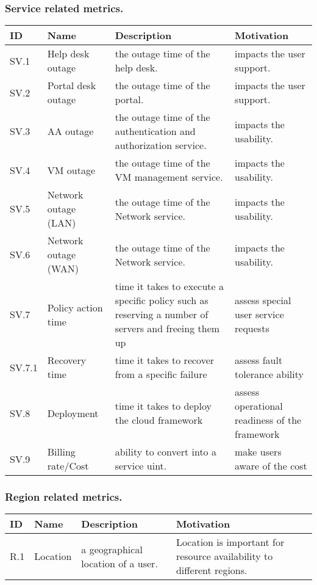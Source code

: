 \documentclass{beamer}
\newcommand{\eTABLE}{\end{tabular}
\end{center}
\end{scriptsize}
}
\newcommand{\bTABLE}[2]{
\frametitle{#1}
\bigskip
\begin{scriptsize}
\begin{center}
\begin{tabular}{lp{0.15\textwidth}p{0.3\textwidth}p{0.4\textwidth}}
\hline
\rowcolor{blue!20} \bf ID & \bf Name & \bf Description & \bf Motivation \\
\hline}
\newenvironment{METRICTABLE}[2] {\bTABLE{#1}{#2}}{\eTABLE}
\begin{document}
\begin{frame}[shrink]
\begin{METRICTABLE}{Service related metrics.}{T:service}
SV.1 &  Help desk outage &  the outage time of the help desk. &  impacts the user support. \\ \hline
SV.2 &  Portal desk outage &  the outage time of the portal. &  impacts the user support. \\ \hline
SV.3 &  AA outage &  the outage time of the authentication and authorization service. &  impacts the usability. \\ \hline
SV.4 &  VM outage &  the outage time of the VM management service. &  impacts the usability. \\ \hline
SV.5 &  Network outage (LAN) &  the outage time of the Network service. &  impacts the usability. \\ \hline
SV.6 &  Network outage (WAN) &  the outage time of the Network service. &  impacts the usability. \\ \hline
SV.7 &  Policy action time & time it takes to execute a specific policy such as reserving a number of servers and freeing them up & assess  special user service requests \\ \hline
SV.7.1 &  Recovery time & time it takes to recover from a specific failure & assess fault tolerance ability \\ \hline
SV.8 &  Deployment & time it takes to deploy the cloud framework  & assess operational readiness of the framework  \\ \hline
SV.9 & Billing rate/Cost & ability to convert into a service uint. 
& make users aware of the cost \\ \hline
\end{METRICTABLE} 
\end{frame}


\begin{frame}[shrink]
\begin{METRICTABLE}{Region related metrics.}{T:region}
R.1 &  Location &  a geographical location of a user. &  Location is important for resource availability to different regions. \\ \hline
\end{METRICTABLE} 
\end{frame}
\end{document}
